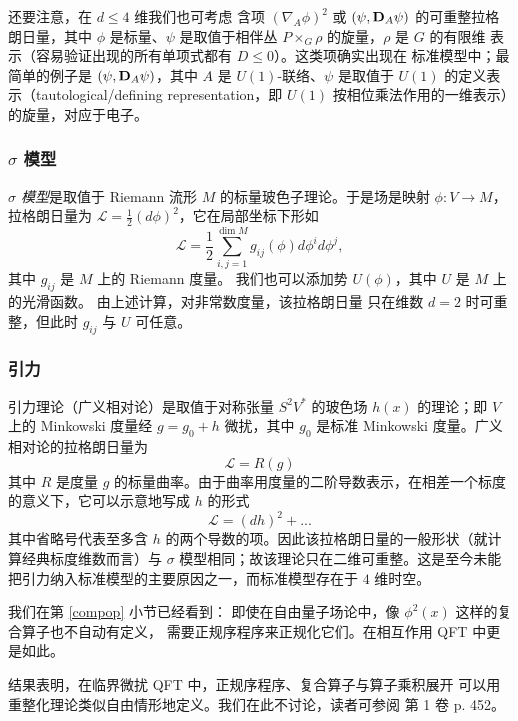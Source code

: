 还要注意，在 $d\le 4$ 维我们也可考虑
含项 $(\nabla_A\phi)^2$ 或 $(\psi,\bold D_A\psi)$ 的可重整拉格朗日量，其中 $\phi$
是标量、$\psi$ 是取值于相伴丛 $P\times_G \rho$ 的旋量，$\rho$ 是 $G$ 的有限维
表示（容易验证出现的所有单项式都有 $D\le 0$）。这类项确实出现在
标准模型中；最简单的例子是 $(\psi,\bold D_A\psi)$，其中
$A$ 是 $U(1)$-联络、$\psi$ 是取值于 $U(1)$ 的定义表示（tautological/defining representation，即 $U(1)$ 按相位乘法作用的一维表示）的旋量，对应于电子。

\subsubsection{$\sigma$ 模型}

\emph{$\sigma$ 模型}是取值于 Riemann 流形 $M$ 的标量玻色子理论。于是场是映射 $\phi: V\to M$，拉格朗日量为
$\mathcal L=\frac{1}{2}(d\phi)^2$，它在局部坐标下形如
$$
\mathcal L=\frac{1}{2}\sum_{i,j=1}^{\dim M}g_{ij}(\phi)d\phi^id\phi^j,
$$
其中 $g_{ij}$ 是 $M$ 上的 Riemann 度量。
我们也可以添加势 $U(\phi)$，其中 $U$ 是 $M$ 上的光滑函数。
由上述计算，对非常数度量，该拉格朗日量
只在维数 $d=2$ 时可重整，但此时 $g_{ij}$ 与 $U$ 可任意。

\subsubsection{引力}

引力理论（广义相对论）是取值于对称张量 $S^2V^*$ 的玻色场 $h(x)$
的理论；即 $V$ 上的 Minkowski 度量经
$g=g_0+h$ 微扰，其中 $g_0$ 是标准
Minkowski 度量。广义相对论的拉格朗日量为
$$
\mathcal L=R(g)
$$
其中 $R$ 是度量 $g$ 的标量曲率。由于曲率用度量的二阶导数表示，在相差一个标度的意义下，它可以示意地写成 $h$ 的形式
$$
\mathcal L=(dh)^2+...
$$
其中省略号代表至多含 $h$ 的两个导数的项。因此该拉格朗日量的一般形状（就计算经典标度维数而言）与 $\sigma$ 模型相同；故该理论只在二维可重整。这是至今未能把引力纳入标准模型的主要原因之一，而标准模型存在于 $4$ 维时空。

\begin{remark} 
我们在第 \ref{compop} 小节已经看到：
即使在自由量子场论中，像 $\phi^2(x)$ 这样的复合算子也不自动有定义，
需要正规序程序来正规化它们。在相互作用 QFT 中更是如此。

结果表明，在临界微扰 QFT 中，正规序程序、复合算子与算子乘积展开
可以用重整化理论类似自由情形地定义。我们在此不讨论，读者可参阅 \cite{QFS} 第 1 卷 p. 452。
\end{remark}


